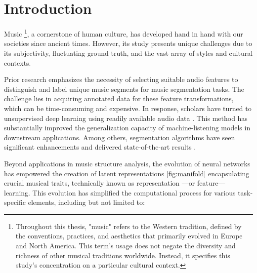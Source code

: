 \chapter{Introduction}

Music \footnote{Throughout this thesis, "music" refers to the Western tradition, defined by the conventions, practices, and aesthetics that primarily evolved in Europe and North America. This term's usage does not negate the diversity and richness of other musical traditions worldwide. Instead, it specifies this study's concentration on a particular cultural context.}, a cornerstone of human culture, has developed hand in hand with our societies since ancient times. However, its study presents unique challenges due to its subjectivity, fluctuating ground truth, and the vast array of styles and cultural contexts.

Prior research emphasizes the necessity of selecting suitable audio features to distinguish and label unique music segments for music segmentation tasks. The challenge lies in acquiring annotated data for these feature transformations, which can be time-consuming and expensive. In response, scholars have turned to unsupervised deep learning using readily available audio data \cite{deepfeaturesegment, Grill2015MusicAnnotations}. This method has substantially improved the generalization capacity of machine-listening models in downstream applications. Among others, segmentation algorithms have seen significant enhancements and delivered state-of-the-art results \cite{Hernandez-Olivan2021MusicFeatures, Li2023MERT:Training}.

Beyond applications in music structure analysis, the evolution of neural networks has empowered the creation of latent representations \ref{fig:manifold} encapsulating crucial musical traits, technically known as representation ---or feature--- learning. This evolution has simplified the computational process for various task-specific elements, including but not limited to:


